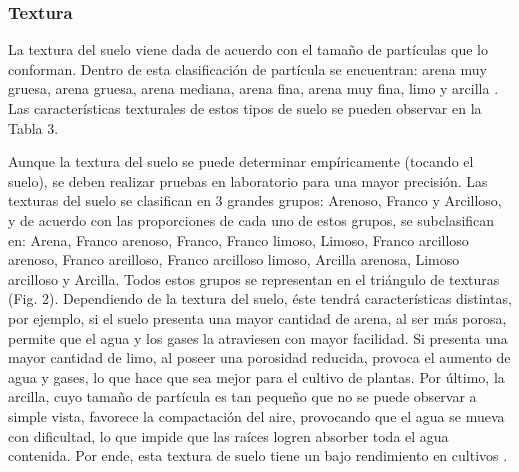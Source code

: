 \documentclass[12pt,letterpaper,oneside]{report}
\begin{document}
\subsubsection{Textura}
La textura del suelo viene dada de acuerdo con el tamaño de partículas que lo conforman. Dentro de esta clasificación de partícula se encuentran: arena muy gruesa, arena gruesa, arena mediana, arena fina, arena muy fina, limo y arcilla \autocite{Lindbo2012}. Las características texturales de estos tipos de suelo se pueden observar en la Tabla 3.
\par
Aunque la textura del suelo se puede determinar empíricamente (tocando el suelo), se deben realizar pruebas en laboratorio para una mayor precisión. Las texturas del suelo se clasifican en 3 grandes grupos: Arenoso, Franco y Arcilloso, y de acuerdo con las proporciones de cada uno de estos grupos, se subclasifican en: Arena, Franco arenoso, Franco, Franco limoso, Limoso, Franco arcilloso arenoso, Franco arcilloso, Franco arcilloso limoso, Arcilla arenosa, Limoso arcilloso y Arcilla. Todos estos grupos se representan en el triángulo de texturas (Fig. 2). Dependiendo de la textura del suelo, éste tendrá características distintas, por ejemplo, si el suelo presenta una mayor cantidad de arena, al ser más porosa, permite que el agua y los gases la atraviesen con mayor facilidad. Si presenta una mayor cantidad de limo, al poseer una porosidad reducida, provoca el aumento de agua y gases, lo que hace que sea mejor para el cultivo de plantas. Por último, la arcilla, cuyo tamaño de partícula es tan pequeño que no se puede observar a simple vista, favorece la compactación del aire, provocando que el agua se mueva con dificultad, lo que impide que las raíces logren absorber toda el agua contenida. Por ende, esta textura de suelo tiene un bajo rendimiento en cultivos \autocite{Chaudhari2013,Lindbo2012}.
\end{document}

